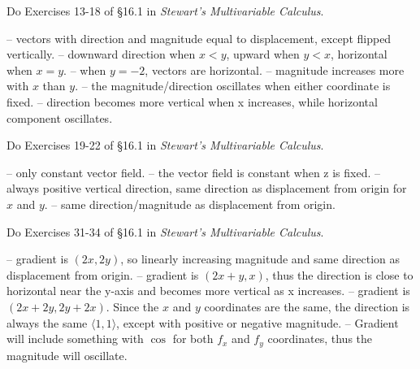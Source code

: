 \documentclass[12pt]{exam}
\begin{document}
\begin{questions}
\clearpage
\question Do Exercises 13-18 of §16.1 in \emph{Stewart's Multivariable Calculus}.
	\begin{solution}
		\begin{questions}
			\setcounter{question}{12}
			\question {} -- vectors with direction and magnitude equal to displacement, except flipped vertically.
			\question {} -- downward direction when $x < y$, upward when $y < x$, horizontal when $x = y$.
			\question {} -- when $y = -2$, vectors are horizontal.
			\question {} -- magnitude increases more with $x$ than $y$.
			\question {} -- the magnitude/direction oscillates when either coordinate is fixed.
			\question {} -- direction becomes more vertical when x increases, while horizontal component oscillates.
		\end{questions}
	\end{solution}
	\clearpage
\setcounter{question}{7}
\question Do Exercises 19-22 of §16.1 in \emph{Stewart's Multivariable Calculus}.
	\begin{solution}
		\begin{questions}
			\setcounter{question}{18}
			\question {} -- only constant vector field.
			\question {} -- the vector field is constant when z is fixed.
			\question {} -- always positive vertical direction, same direction as displacement from origin for $x$ and $y$.
			\question {} -- same direction/magnitude as displacement from origin.
		\end{questions}
	\end{solution}
	\clearpage
\setcounter{question}{8}
\question Do Exercises 31-34 of §16.1 in \emph{Stewart's Multivariable Calculus}.
	\begin{solution}
		\begin{questions}
			\setcounter{question}{30}
			\question {} -- gradient is $(2x, 2y)$, so linearly increasing magnitude and same direction as displacement from origin.
			\question {} -- gradient is $(2x + y, x)$, thus the direction is close to horizontal near the y-axis and becomes more vertical as x increases.
			\question {} -- gradient is $(2x + 2y, 2y + 2x)$. Since the $x$ and $y$ coordinates are the same, the direction is always the same $\langle 1, 1 \rangle$, except with positive or negative magnitude.
			\question {} -- Gradient will include something with $\cos$ for both $f_x$ and $f_y$ coordinates, thus the magnitude will oscillate.
		\end{questions}
	\end{solution}
\end{questions}
\end{document}
